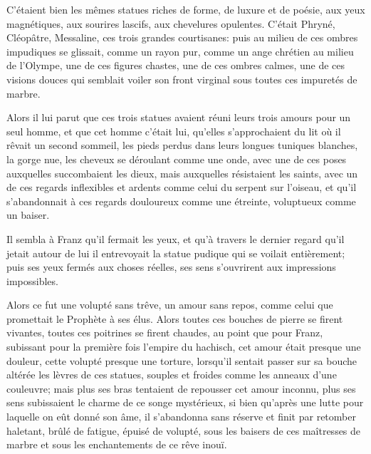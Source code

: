 C'étaient bien les mêmes statues riches de forme, de luxure et de poésie, aux yeux magnétiques, aux sourires lascifs, aux chevelures opulentes. C'était Phryné, Cléopâtre, Messaline, ces trois grandes courtisanes: puis au milieu de ces ombres impudiques se glissait, comme un rayon pur, comme un ange chrétien au milieu de l'Olympe, une de ces figures chastes, une de ces ombres calmes, une de ces visions douces qui semblait voiler son front virginal sous toutes ces impuretés de marbre.

Alors il lui parut que ces trois statues avaient réuni leurs trois amours pour un seul homme, et que cet homme c'était lui, qu'elles s'approchaient du lit où il rêvait un second sommeil, les pieds perdus dans leurs longues tuniques blanches, la gorge nue, les cheveux se déroulant comme une onde, avec une de ces poses auxquelles succombaient les dieux, mais auxquelles résistaient les saints, avec un de ces regards inflexibles et ardents comme celui du serpent sur l'oiseau, et qu'il s'abandonnait à ces regards douloureux comme une étreinte, voluptueux comme un baiser.

Il sembla à Franz qu'il fermait les yeux, et qu'à travers le dernier regard qu'il jetait autour de lui il entrevoyait la statue pudique qui se voilait entièrement; puis ses yeux fermés aux choses réelles, ses sens s'ouvrirent aux impressions impossibles.

Alors ce fut une volupté sans trêve, un amour sans repos, comme celui que promettait le Prophète à ses élus. Alors toutes ces bouches de pierre se firent vivantes, toutes ces poitrines se firent chaudes, au point que pour Franz, subissant pour la première fois l'empire du hachisch, cet amour était presque une douleur, cette volupté presque une torture, lorsqu'il sentait passer sur sa bouche altérée les lèvres de ces statues, souples et froides comme les anneaux d'une couleuvre; mais plus ses bras tentaient de repousser cet amour inconnu, plus ses sens subissaient le charme de ce songe mystérieux, si bien qu'après une lutte pour laquelle on eût donné son âme, il s'abandonna sans réserve et finit par retomber haletant, brûlé de fatigue, épuisé de volupté, sous les baisers de ces maîtresses de marbre et sous les enchantements de ce rêve inouï.

